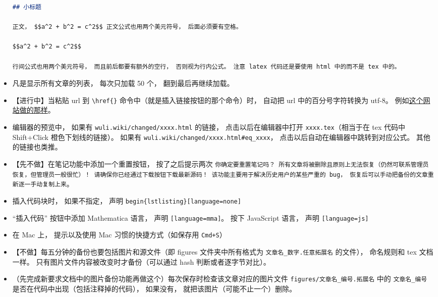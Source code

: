 \begin{itemize}
\begin{lstlisting}[language=markdown]
## 小标题

正文， $$a^2 + b^2 = c^2$$ 正文公式也用两个美元符号， 后面必须要有空格。

$$a^2 + b^2 = c^2$$

行间公式也用两个美元符号， 而且前后都要有额外的空行， 否则视为行内公式。 注意 latex 代码还是要使用 html 中的而不是 tex 中的。
\end{lstlisting}

\item 凡是显示所有文章的列表， 每次只加载 50 个， 翻到最后再继续加载。

\item 【进行中】当粘贴 url 到 \verb`\href{}` 命令中（就是插入链接按钮的那个命令）时， 自动把 url 中的百分号字符转换为 utf-8。 例如\href{https://www.webatic.com/url-convertor}{这个网站做的那样}。

\item 编辑器的预览中， 如果有 \verb`wuli.wiki/changed/xxxx.html` 的链接， 点击以后在编辑器中打开 \verb`xxxx.tex`（相当于在 tex 代码中 Shift+Click 橙色下划线的链接）。 如果有 \verb`wuli.wiki/changed/xxxx.html#eq_xxxx`， 点击以后自动在编辑器中跳转到对应公式。 其他的链接也类推。

\item 【先不做】在笔记功能中添加一个重置按钮， 按了之后提示两次 \verb`你确定要重置笔记吗？ 所有文章将被删除且原则上无法恢复（仍然可联系管理员恢复，但管理员一般很忙）！ 请确保你已经通过下载按钮下载最新源码！ 该功能主要用于解决历史用户的某些严重的 bug， 恢复后可以手动把备份的文章重新逐一手动复制上来`。

\item 插入代码块时， 如果不指定， 声明 \verb`begin{lstlisting}[language=none]`

\item “插入代码” 按钮中添加 Mathematica 语言， 声明 \verb`[language=mma]`。 按下 JavaScript 语言， 声明 \verb`[language=js]`

\item 在 Mac 上， 提示以及使用 Mac 习惯的快捷方式（如保存用 \verb`Cmd+S`）

\item 【不做】每五分钟的备份也要包括图片和源文件（即 figures 文件夹中所有格式为 \verb`文章名_数字.任意拓展名` 的文件）， 命名规则和 tex 文档一样。 只有图片文件内容被改变时才备份（可以通过 hash 判断或者逐字节对比）。

\item （先完成新要求文档中的图片备份功能再做这个）每次保存时检查该文章对应的图片文件 \verb`figures/文章名_编号.拓展名` 中的 \verb`文章名_编号` 是否在代码中出现（包括注释掉的代码）， 如果没有， 就把该图片（可能不止一个）删除。


\end{itemize}
